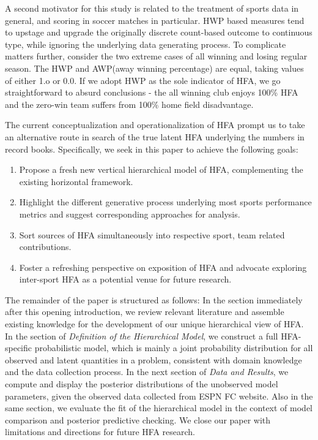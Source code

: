 \documentclass[]{interact}
\theoremstyle{plain}%
\theoremstyle{definition}
\theoremstyle{remark}
\begin{document}
A second motivator for this study is related to the treatment of sports data in general, and scoring in soccer matches in particular. HWP based measures tend to upstage and upgrade the originally discrete count-based outcome to continuous type, while ignoring the underlying data generating process. To complicate matters further, consider the two extreme cases of all winning and losing regular season. The HWP and AWP(away winning percentage) are equal, taking values of either 1.o or 0.0. If we adopt HWP as the sole indicator of HFA, we go straightforward to absurd conclusions - the all winning club enjoys 100\% HFA and the zero-win team suffers from 100\% home field disadvantage.   

The current conceptualization and operationalization of HFA prompt us to take an alternative route in search of the true latent HFA underlying the numbers in record books. Specifically, we seek in this paper to achieve the following goals: 

\begin{enumerate}
	\item  Propose a fresh new vertical hierarchical model of HFA, complementing the existing horizontal framework.
	\item Highlight the different generative process underlying most sports performance metrics and suggest corresponding approaches for analysis.
	\item Sort sources of HFA simultaneously into respective sport, team related contributions.
	\item Foster a refreshing perspective on exposition of HFA and advocate exploring inter-sport HFA as a potential venue for future research.
\end{enumerate}

The remainder of the paper is structured as follows: In the section immediately after this opening introduction, we review relevant literature and assemble existing knowledge for the development of our unique hierarchical view of HFA. 
In the section of \textit{Definition of the Hierarchical Model}, we construct a full HFA-specific probabilistic model, which is mainly a joint probability distribution for all observed and latent quantities in a problem, consistent with domain knowledge and the data collection process.
In the next section of \textit{Data and Results}, we compute and display the posterior distributions of the unobserved model parameters, given the observed data collected from ESPN FC website. Also in the same section, we evaluate the fit of the hierarchical model in the context of model comparison and posterior predictive checking. We close our paper with limitations and directions for future HFA research.
\end{document}
